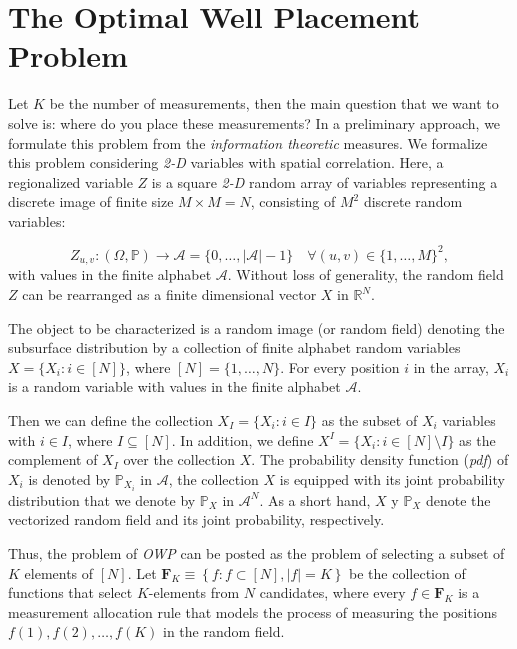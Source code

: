 \section{The Optimal Well Placement Problem}
\label{sec_Meth_fOSP}

Let $K$ be the number of measurements, then the main question that we want to solve is: where do you place these measurements? In a preliminary approach, we formulate this problem from the  \emph{information theoretic} measures. We formalize this problem considering \emph{2-D} variables with spatial correlation. Here, a regionalized variable $Z$ is a square \emph{2-D} random array of variables representing a discrete image of finite size $M \times M = N$, consisting of $M^2$ discrete random variables:

\begin{equation} \label{eq:Pre_Z}
Z_{u,v} :(\Omega,\mathds{P})\rightarrow \mathcal{A} = \{0, \ldots, \lvert \mathcal{A} \rvert -1 \} \quad \forall  (u,v) \in \lbrace 1,\ldots,M\rbrace^2 ,
\end{equation}
with values in the finite alphabet $\mathcal{A}$. Without loss of generality, the random field $Z$ can be rearranged as a finite dimensional vector $X$ in $\mathbb{R}^N$.

The object to be characterized is a random image (or random field) denoting the subsurface distribution by a collection of finite alphabet random variables $X = \{X_{ i } : i \in [N]\}$, where $[N] =\{1, \ldots ,N\}$. For every position $i$ in the array, $X_{ i }$ is a random variable with values in the finite alphabet $\mathcal{A}$. 

Then we can define the collection $X_I = \{X_{ i } : i \in I \}$ as the subset of ${X_{ i }}$ variables with $i \in I$, where $I \subseteq [N].$ %
In addition, we define $X^{I} = \{X_{ i }: i \in [N] \setminus I \}$ as the complement of $X_I$ over the collection $X$. The probability density function (\emph{pdf}) of $X_{ i }$ is denoted by $\mathds{P}_{X_{ i }}$ in $\mathcal{A}$, the collection $X$ is equipped with its joint probability distribution that we denote by $\mathds{P}_{X}$ in $\mathcal{A}^{N}$. As a short hand,  $X$ y $\mathds{P}_X$ denote the vectorized random field and its joint probability, respectively.  

Thus, the problem of \emph{OWP} can be posted as the problem of selecting a subset of $K$ elements of $[N]$. Let $\mathbf{F}_K \equiv \left\{ f: f \subset [N] , |f| = K \right\}$ be the collection of functions that select $K$-elements from $N$ candidates, where every $f \in \mathbf{F}_K$ is a measurement allocation rule that models the process of measuring the positions $f(1),f(2),\ldots,f(K)$ in the random field.

